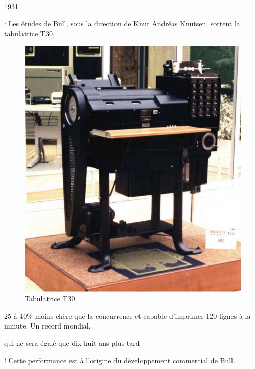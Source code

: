 \documentclass{article}
\begin{document}
		\paragraph{}
		\begin{bf}1931\end{bf}: Les études de Bull, sous la direction de Knut Andréas Knutsen, sortent la tabulatrice T30,
		\begin{figure}
		\includegraphics[scale=0.25]{tabulatrice_t30.jpg}
		\caption{Tabulatrice T30}
		\end{figure}
		25 à 40\% moins chère que la concurrence et capable d’imprimer 120 lignes à la minute. Un record mondial, \begin{bf}qui 
		ne sera égalé que dix-huit ans plus tard\end{bf}! Cette performance est à l’origine du développement commercial de Bull.
		\newline{}
		\newline{}
		\newline{}
		\newline{}
		\newline{}
		\newline{}
		\newline{}
		\newline{}
\end{document}
